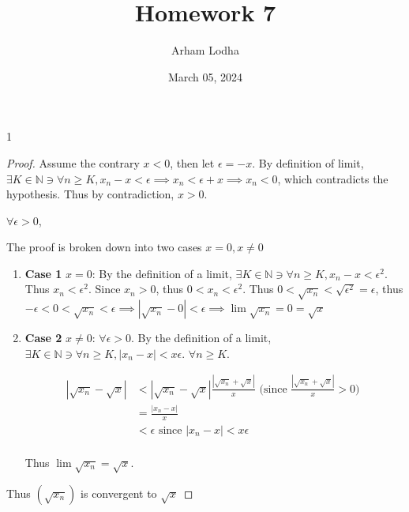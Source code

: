 \documentclass{article}
\newcommand{\N}{\mathbb{N}}
\newcommand{\abs}[1]{\left\lvert#1\right\rvert}
\begin{document}
\title{Homework 7}
\author{Arham Lodha}%
\date{March 05, 2024}%
\maketitle

\begin{PROB}{1}\label{Problem 1.}
\end{PROB}
\begin{proof}
    Assume the contrary $x < 0$, then let $\epsilon = -x$. By definition of limit, $\exists K \in \N \ni \forall n \geq K, x_n - x < \epsilon \implies x_n < \epsilon + x \implies x_n < 0$, which contradicts the hypothesis. Thus by contradiction, $x > 0$.       

    $\forall \epsilon > 0$, 
    
    The proof is broken down into two cases $x = 0, x \neq 0$ 
    \begin{enumerate}
        \item \textbf{Case 1} $x = 0$: By the definition of a limit, $\exists K \in \N \ni \forall n \geq K, x_n - x < \epsilon^2$. Thus $x_n < \epsilon^2$. Since $x_n > 0$, thus $0 < x_n < \epsilon^2$. Thus $0 < \sqrt{x_n} < \sqrt{\epsilon^2} = \epsilon$, thus $-\epsilon < 0 < \sqrt{x_n} < \epsilon \implies \abs{\sqrt{x_n} - 0} < \epsilon \implies \lim {\sqrt{x_n}} = 0 = \sqrt{x}$
        \item \textbf{Case 2} $x \neq 0$: $\forall \epsilon > 0$. By the definition of a limit, $\exists K \in \N \ni \forall n \geq K, \abs{x_n - x} < x\epsilon$. $\forall n \geq K$.    
    
    
        \begin{align*}
            \abs{\sqrt{x_n}-\sqrt{x}} &< \abs{\sqrt{x_n}-\sqrt{x}} \frac{\abs{\sqrt{x_n} + \sqrt{x}}}{x} \text{ (since $\frac{\abs{\sqrt{x_n} + \sqrt{x}}}{x} > 0$) } \\
            &= \frac{\abs{x_n - x}}{x} \\
            &< \epsilon \text{ since $\abs{x_n - x} < x\epsilon$ } \\
        \end{align*} 
        
        Thus $\lim \sqrt{x_n} = \sqrt{x}$. 
    \end{enumerate}
    
    Thus $\left(\sqrt{x_n}\right)$ is convergent to $\sqrt{x}$  
\end{proof}

\bigskip
\end{document}
